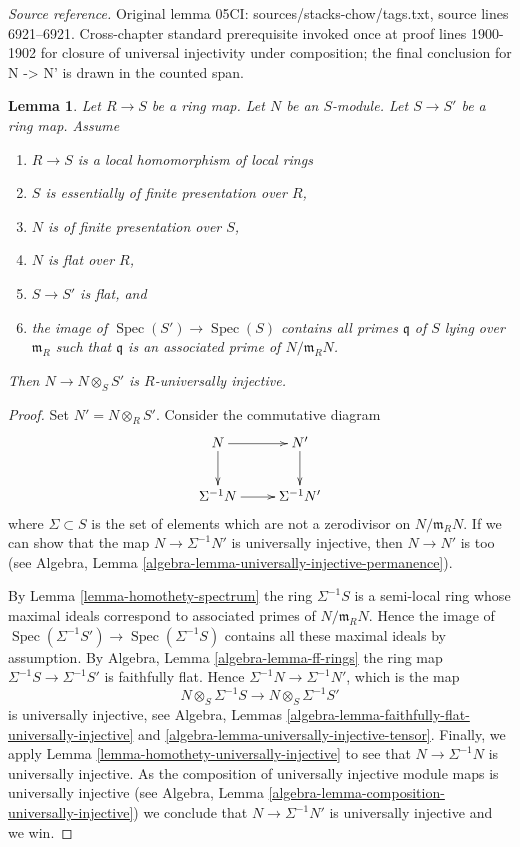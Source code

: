 \documentclass[10pt,a4paper]{amsart}
\theoremstyle{plain}
\newtheorem{lemma}[subsection]{Lemma}
\theoremstyle{definition}
\theoremstyle{remark}
\numberwithin{equation}{subsection}
\def\Spec{\mathop{\mathrm{Spec}}}
\begin{document}
\noindent\textit{Source reference.} Original lemma 05CI: sources/stacks-chow/tags.txt, source lines 6921--6921. Cross-chapter standard prerequisite invoked once at proof lines 1900-1902 for closure of universal injectivity under composition; the final conclusion for N -> N' is drawn in the counted span.\par\medskip
\begin{lemma}
\label{lemma-base-change-universally-flat-local}
Let $R \to S$ be a ring map.
Let $N$ be an $S$-module.
Let $S \to S'$ be a ring map.
Assume
\begin{enumerate}
\item $R \to S$ is a local homomorphism of local rings
\item $S$ is essentially of finite presentation over $R$,
\item $N$ is of finite presentation over $S$,
\item $N$ is flat over $R$,
\item $S \to S'$ is flat, and
\item the image of $\Spec(S') \to \Spec(S)$ contains
all primes $\mathfrak q$ of $S$ lying over $\mathfrak m_R$
such that $\mathfrak q$ is an associated prime of $N/\mathfrak m_R N$.
\end{enumerate}
Then $N \to N \otimes_S S'$ is $R$-universally injective.
\end{lemma}

\begin{proof}
Set $N' = N \otimes_R S'$. Consider the commutative diagram
$$
\xymatrix{
N \ar[d] \ar[r] & N' \ar[d] \\
\Sigma^{-1}N \ar[r] & \Sigma^{-1}N'
}
$$
where $\Sigma \subset S$ is the set of elements which are not a
zerodivisor on $N/\mathfrak m_R N$. If we can show that the map
$N \to \Sigma^{-1}N'$ is universally injective, then $N \to N'$
is too (see
Algebra, Lemma \ref{algebra-lemma-universally-injective-permanence}).

\medskip\noindent
By
Lemma \ref{lemma-homothety-spectrum}
the ring $\Sigma^{-1}S$ is a semi-local ring whose maximal ideals
correspond to associated primes of $N/\mathfrak m_R N$.
Hence the image of
$\Spec(\Sigma^{-1}S') \to \Spec(\Sigma^{-1}S)$
contains all these maximal ideals by assumption. By
Algebra, Lemma \ref{algebra-lemma-ff-rings}
the ring map $\Sigma^{-1}S \to \Sigma^{-1}S'$ is faithfully flat.
Hence $\Sigma^{-1}N \to \Sigma^{-1}N'$, which is the map
$$
N \otimes_S \Sigma^{-1}S \longrightarrow N \otimes_S \Sigma^{-1}S'
$$
is universally injective, see
Algebra, Lemmas \ref{algebra-lemma-faithfully-flat-universally-injective} and
\ref{algebra-lemma-universally-injective-tensor}.
Finally, we apply
Lemma \ref{lemma-homothety-universally-injective}
to see that $N \to \Sigma^{-1}N$ is universally injective.
As the composition of universally injective module maps is universally
injective (see
Algebra, Lemma \ref{algebra-lemma-composition-universally-injective})
we conclude that $N \to \Sigma^{-1}N'$ is universally injective and we win.
\end{proof}
\end{document}
